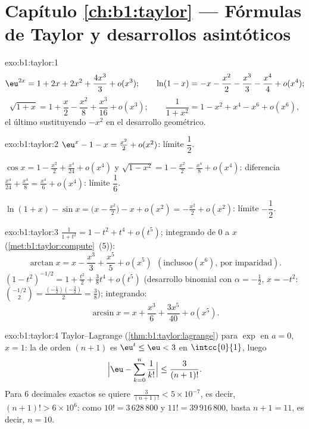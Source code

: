 \section*{Capítulo \ref{ch:b1:taylor} --- Fórmulas de Taylor y
desarrollos asintóticos}

\begin{solution}{exo:b1:taylor:1}
\[
\eu^{2x} = 1 + 2x + 2x^2 + \frac{4x^3}{3} + o(x^3);
\qquad
\ln(1 - x) = -x - \frac{x^2}{2} - \frac{x^3}{3} - \frac{x^4}{4} +
o(x^4);
\]
\[
\sqrt{1+x} = 1 + \frac x2 - \frac{x^2}{8} + \frac{x^3}{16} + o(x^3);
\qquad
\frac{1}{1 + x^2} = 1 - x^2 + x^4 - x^6 + o(x^6),
\]
el último sustituyendo $-x^2$ en el desarrollo geométrico.
\end{solution}

\begin{solution}{exo:b1:taylor:2}
$\eu^x - 1 - x = \frac{x^2}{2} + o(x^2)$: límite $\dfrac12$.

$\cos x = 1 - \frac{x^2}{2} + \frac{x^4}{24} + o(x^4)$ y
$\sqrt{1 - x^2} = 1 - \frac{x^2}{2} - \frac{x^4}{8} + o(x^4)$:
diferencia $\frac{x^4}{24} + \frac{x^4}{8} = \frac{x^4}{6} + o(x^4)$:
límite $\dfrac16$.

$\ln(1+x) - \sin x = \bigl(x - \frac{x^2}{2}\bigr) - x + o(x^2) =
-\frac{x^2}{2} + o(x^2)$: límite $-\dfrac12$.
\end{solution}

\begin{solution}{exo:b1:taylor:3}
$\frac{1}{1+t^2} = 1 - t^2 + t^4 + o(t^5)$; integrando de $0$ a $x$
(\cref{met:b1:taylor:compute}~(5)):
\[
\arctan x = x - \frac{x^3}{3} + \frac{x^5}{5} + o(x^5)\ \ (\text{incluso
}o(x^6)\text{, por imparidad}).
\]
$(1 - t^2)^{-1/2} = 1 + \frac{t^2}{2} + \frac38 t^4 + o(t^5)$
(desarrollo binomial con $\alpha = -\frac12$, $x = -t^2$:
$\binom{-1/2}{2} = \frac{(-\frac12)(-\frac32)}{2} = \frac38$);
integrando:
\[
\arcsin x = x + \frac{x^3}{6} + \frac{3x^5}{40} + o(x^5) .
\]
\end{solution}

\begin{solution}{exo:b1:taylor:4}
Taylor--Lagrange (\cref{thm:b1:taylor:lagrange}) para $\exp$ en
$a = 0$, $x = 1$: la  de orden $(n+1)$ es $\eu^t \leq \eu < 3$
en $\intcc{0}{1}$, luego
\[
\Bigl|\eu - \sum_{k=0}^{n} \frac{1}{k!}\Bigr| \leq
\frac{3}{(n+1)!} .
\]
Para $6$ decimales exactos se quiere
$\frac{3}{(n+1)!} < 5\times 10^{-7}$, es decir,
$(n+1)! > 6\times 10^{6}$: como $10! = 3\,628\,800$ y
$11! = 39\,916\,800$, basta $n + 1 = 11$, es decir, $n = 10$.
\end{solution}

